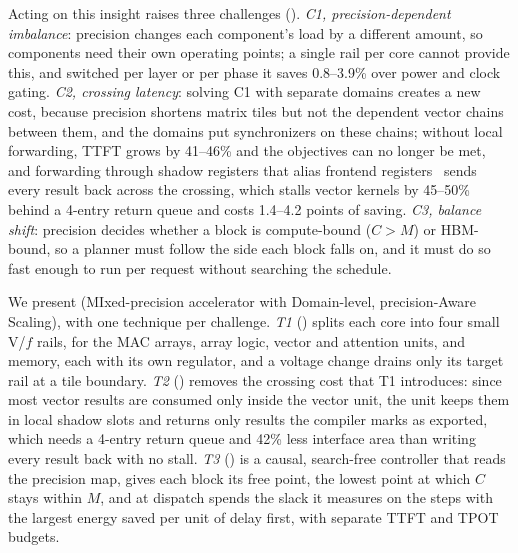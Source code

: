 Acting on this insight raises three challenges ().
\emph{C1, precision-dependent imbalance}: precision changes each component's load by a different amount, so components need their own operating points; a single rail per core cannot provide this, and switched per layer or per phase it saves 0.8--3.9\% over power and clock gating.
\emph{C2, crossing latency}: solving C1 with separate domains creates a new cost, because precision shortens matrix tiles but not the dependent vector chains between them, and the domains put synchronizers on these chains; without local forwarding, TTFT grows by 41--46\% and the objectives can no longer be met, and forwarding through shadow registers that alias frontend registers~\cite{xue2026finedvfs} sends every result back across the crossing, which stalls vector kernels by 45--50\% behind a 4-entry return queue and costs 1.4--4.2 points of saving.
\emph{C3, balance shift}: precision decides whether a block is compute-bound ($C>M$) or HBM-bound, so a planner must follow the side each block falls on, and it must do so fast enough to run per request without searching the schedule.

We present \sys{} (MIxed-precision accelerator with Domain-level, precision-Aware Scaling), with one technique per challenge.
\emph{T1} () splits each core into four small V/$f$ rails, for the MAC arrays, array logic, vector and attention units, and memory, each with its own regulator, and a voltage change drains only its target rail at a tile boundary.
\emph{T2} () removes the crossing cost that T1 introduces: since most vector results are consumed only inside the vector unit, the unit keeps them in local shadow slots and returns only results the compiler marks as exported, which needs a 4-entry return queue and 42\% less interface area than writing every result back with no stall.
\emph{T3} () is a causal, search-free controller that reads the precision map, gives each block its free point, the lowest point at which $C$ stays within $M$, and at dispatch spends the slack it measures on the steps with the largest energy saved per unit of delay first, with separate TTFT and TPOT budgets.

